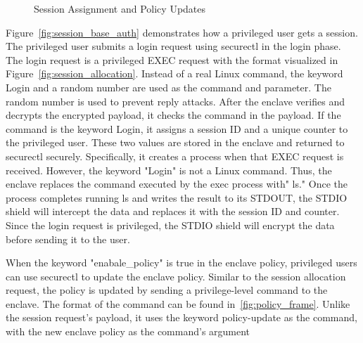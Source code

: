 \begin{figure}[!htb]
\begin{minipage}{0.9\textwidth}
\begin{subcolumns}[0.62\textwidth]
    \nextsubfigure
    \end{subcolumns}
    \end{minipage}
    
    \caption[Session Assignment and Policy Updates]{Session Assignment and Policy Updates}
    \label{fig:session_policy}
\end{figure}


Figure~\ref{fig:session_base_auth} demonstrates how a privileged user gets a session. The privileged user submits a login request using securectl in the login phase. The login request is a privileged EXEC request with the format visualized in Figure~\ref{fig:session_allocation}. Instead of a real Linux command, the keyword Login and a random number 
are used as the command and parameter. The random number is used to prevent reply attacks. After the enclave verifies and decrypts the encrypted payload, it checks the command in the payload. If the command is the keyword Login, it assigns a session ID and a unique counter to the privileged user. 
These two values are stored in the enclave and returned to securectl securely. Specifically, it creates a process when that EXEC request is received. However, the keyword "Login" is not a Linux command. Thus, the enclave replaces the command executed by the exec process with" ls." Once the process 
completes running ls and writes the result to its STDOUT, the STDIO shield will intercept the data and replaces it with the session ID and counter. Since the login request is privileged, the STDIO shield will encrypt the data before sending it to the user. 

When the keyword "enabale\_policy" is true in the enclave policy, privileged users can use securectl to update the enclave policy. Similar to the session allocation request, the policy is updated by sending a privilege-level command to the enclave. The format of the command can be found in~\ref{fig:policy_frame}. Unlike 
the session request's payload, it uses the keyword policy-update as the command, with the new enclave policy as the command's argument

